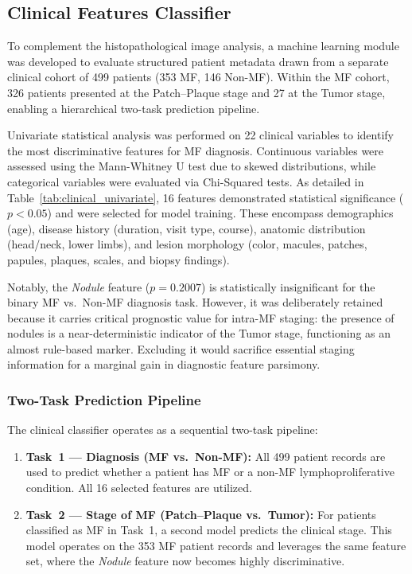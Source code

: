 \documentclass[conference]{IEEEtran}
\begin{document}
\subsection{Clinical Features Classifier}
To complement the histopathological image analysis, a machine learning module was developed to evaluate structured patient metadata drawn from a separate clinical cohort of 499 patients (353 MF, 146 Non-MF). Within the MF cohort, 326 patients presented at the Patch--Plaque stage and 27 at the Tumor stage, enabling a hierarchical two-task prediction pipeline.

Univariate statistical analysis was performed on 22 clinical variables to identify the most discriminative features for MF diagnosis. Continuous variables were assessed using the Mann-Whitney U test due to skewed distributions, while categorical variables were evaluated via Chi-Squared tests. As detailed in Table~\ref{tab:clinical_univariate}, 16 features demonstrated statistical significance ($p < 0.05$) and were selected for model training. These encompass demographics (age), disease history (duration, visit type, course), anatomic distribution (head/neck, lower limbs), and lesion morphology (color, macules, patches, papules, plaques, scales, and biopsy findings).

Notably, the \textit{Nodule} feature ($p = 0.2007$) is statistically insignificant for the binary MF vs.\ Non-MF diagnosis task. However, it was deliberately retained because it carries critical prognostic value for intra-MF staging: the presence of nodules is a near-deterministic indicator of the Tumor stage, functioning as an almost rule-based marker. Excluding it would sacrifice essential staging information for a marginal gain in diagnostic feature parsimony.

\subsubsection{Two-Task Prediction Pipeline}
The clinical classifier operates as a sequential two-task pipeline:
\begin{enumerate}
    \item \textbf{Task~1 --- Diagnosis (MF vs.\ Non-MF):} All 499 patient records are used to predict whether a patient has MF or a non-MF lymphoproliferative condition. All 16 selected features are utilized.
    \item \textbf{Task~2 --- Stage of MF (Patch--Plaque vs.\ Tumor):} For patients classified as MF in Task~1, a second model predicts the clinical stage. This model operates on the 353 MF patient records and leverages the same feature set, where the \textit{Nodule} feature now becomes highly discriminative.
\end{enumerate}
\end{document}
